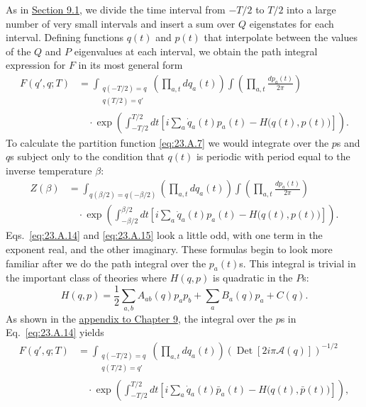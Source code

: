 As in \hyperref[sec:9.1]{Section 9.1}, we divide the time interval from $-T/2$ to $T/2$ into a large number of very small intervals and insert a sum over $Q$ eigenstates for each interval. Defining functions $q(t)$ and $p(t)$ that interpolate between the values of the $Q$ and $P$ eigenvalues at each interval, we obtain the path integral expression for $F$ in its most general form
\begin{equation}
\begin{aligned}
 F(q',q;T)
 &=
 \int_{\substack{q(-T/2)=q\\q(T/2)=q'}}
 \left(\prod_{a,t}dq_a(t)\right)
 \int\left(\prod_{a,t}\frac{dp_a(t)}{2\pi}\right)\\
 &\quad{}\cdot
 \exp\left(
 \int_{-T/2}^{T/2}dt
 \left[
 i\sum_a\dot q_a(t)p_a(t)-H\bigl(q(t),p(t)\bigr)
 \right]
 \right).
\end{aligned}
 \tag{23.A.14}\label{eq:23.A.14}
\end{equation}
To calculate the partition function \eqref{eq:23.A.7} we would integrate over the $p$s and $q$s subject only to the condition that $q(t)$ is periodic with period equal to the inverse temperature $\beta$:
\begin{equation}
\begin{aligned}
 Z(\beta)
 &=
 \int_{q(\beta/2)=q(-\beta/2)}
 \left(\prod_{a,t}dq_a(t)\right)
 \int\left(\prod_{a,t}\frac{dp_a(t)}{2\pi}\right)\\
 &\quad{}\cdot
 \exp\left(
 \int_{-\beta/2}^{\beta/2}dt
 \left[
 i\sum_a\dot q_a(t)p_a(t)-H\bigl(q(t),p(t)\bigr)
 \right]
 \right).
\end{aligned}
 \tag{23.A.15}\label{eq:23.A.15}
\end{equation}
Eqs.~\eqref{eq:23.A.14} and \eqref{eq:23.A.15} look a little odd, with one term in the exponent real, and the other imaginary. These formulas begin to look more familiar after we do the path integral over the $p_a(t)$s. This integral is trivial in the important class of theories where $H(q,p)$ is quadratic in the $P$s:
\begin{equation}
 H(q,p)=\frac{1}{2}\sum_{a,b}A_{ab}(q)p_ap_b
 +\sum_aB_a(q)p_a+C(q).
 \tag{23.A.16}\label{eq:23.A.16}
\end{equation}
As shown in the \hyperref[app:9]{appendix to Chapter 9}, the integral over the $p$s in Eq.~\eqref{eq:23.A.14} yields
\begin{equation}
\begin{aligned}
 F(q',q;T)
 &=
 \int_{\substack{q(-T/2)=q\\q(T/2)=q'}}
 \left(\prod_{a,t}dq_a(t)\right)
 \left(\operatorname{Det}\left[2i\pi\mathcal A(q)\right]\right)^{-1/2}\\
 &\quad{}\cdot
 \exp\left(
 \int_{-T/2}^{T/2}dt
 \left[
 i\sum_a\dot q_a(t)\bar p_a(t)
 -H\bigl(q(t),\bar p(t)\bigr)
 \right]
 \right),
\end{aligned}
 \tag{23.A.17}\label{eq:23.A.17}
\end{equation}
